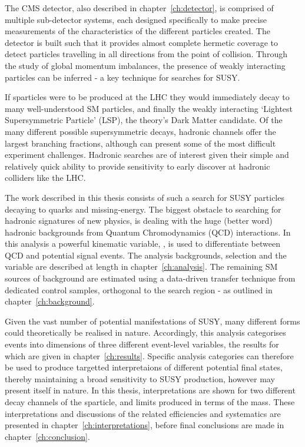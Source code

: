 The CMS detector, also described in chapter~\ref{ch:detector}, is comprised of
multiple sub-detector systems, each designed
specifically to make precise measurements of the characteristics of the
different particles created. The detector is built such that it provides almost
complete hermetic coverage to detect particles travelling in all directions
from the point of collision. Through the study of global momentum imbalances,
the presence of weakly interacting particles can be inferred - a key technique
for searches for SUSY.

If sparticles were to be produced at the LHC they would immediately decay to
many well-understood SM particles, and finally the weakly interacting `Lightest
Supersymmetric Particle' (LSP), the theory's Dark Matter candidate. Of the many
different possible supersymmetric decays, hadronic channels offer the largest
branching fractions, although can present some of the most difficult experiment
challenges. Hadronic searches are of interest given their simple and relatively
quick ability to provide sensitivity to early discover at hadronic colliders
like the LHC.

The work described in this thesis consists of such a search for SUSY particles
decaying to quarks and missing-energy. The biggest obstacle to
searching for hadronic signatures of new physics, is dealing with the huge
(better word) hadronic backgrounds from Quantum Chromodynamics (QCD)
interactions. In this
analysis a powerful kinematic variable, \alphat, is used to differentiate
between QCD and potential signal events. The analysis backgrounds, selection and
the \alphat variable are described at length in chapter~\ref{ch:analysis}. The
remaining SM sources of background
are estimated using a data-driven transfer technique from dedicated control
samples, orthogonal to the search region - as outlined in
chapter~\ref{ch:background}.

Given the vast number of potential manifestations of SUSY, many different forms
could theoretically be realised in nature. Accordingly, this analysis
categorises events into dimensions of three different event-level variables,
the results for which are given in chapter~\ref{ch:results}.
Specific analysis categories can therefore be used to produce targetted
interpretaions of different potential final states, thereby maintaining a broad
sensitivity to SUSY production, however may present itself in nature. In this
thesis,
interpretations are shown for two different decay channels of the \sTop
sparticle, and limits produced in terms of the \sTop mass. These interpretations
and discussions of the related efficiencies and systematics are presented in
chapter~\ref{ch:interpretations}, before final conclusions are made in
chapter~\ref{ch:conclusion}.

